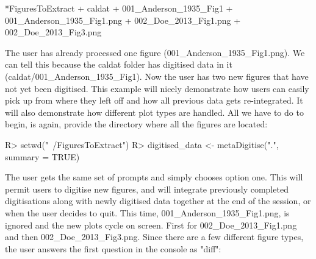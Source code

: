 \documentclass[article]{jss}
\begin{document}
\begin{CodeChunk}
\begin{CodeOutput}
*FiguresToExtract
	+ caldat
	  	+ 001_Anderson_1935_Fig1
    + 001_Anderson_1935_Fig1.png
    + 002_Doe_2013_Fig1.png
    + 002_Doe_2013_Fig3.png
\end{CodeOutput}
\end{CodeChunk}

The user has already processed one figure (001\_Anderson\_1935\_Fig1.png). We can tell this because the caldat folder has digitised data in it (caldat/001\_Anderson\_1935\_Fig1). Now the user has two new figures that have not yet been digitised. This example will nicely demonstrate how users can easily pick up from where they left off and how all previous data gets re-integrated. It will also demonstrate how different plot types are handled. All we have to do to begin, is again, provide the directory where all the figures are located:

\begin{CodeChunk}
\begin{CodeInput}
R> setwd("~/FiguresToExtract")
R> digitised_data <- metaDigitise(".", summary = TRUE)
\end{CodeInput}
\end{CodeChunk}

The user gets the same set of prompts and simply chooses option one. This will permit users to digitise new figures, and will integrate previously completed digitisations along with newly digitised data together at the end of the session, or when the user decides to quit. This time, 001\_Anderson\_1935\_Fig1.png, is ignored and the new plots cycle on screen. First for 002\_Doe\_2013\_Fig1.png and then 002\_Doe\_2013\_Fig3.png. Since there are a few different figure types, the user answers the first question in the  console as "diff":
\end{document}
